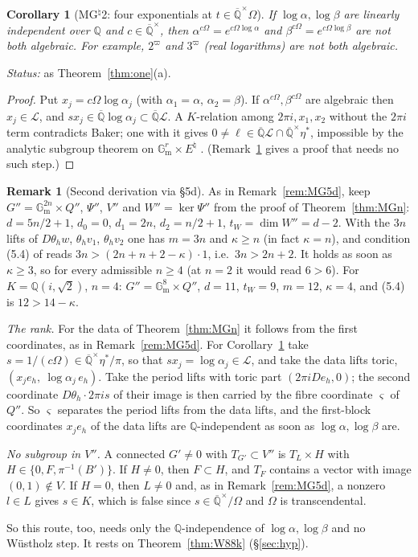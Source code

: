 \documentclass[11pt]{amsart}
\newtheorem{corollary}[theorem]{Corollary}
\theoremstyle{definition}
\newtheorem{remark}[theorem]{Remark}
\newcommand{\Qb}{\overline{\mathbb{Q}}}
\newcommand{\Q}{\mathbb{Q}}
\newcommand{\Gm}{\mathbb{G}_{\mathrm m}}
\newcommand{\Lg}{\mathcal{L}}
\newcommand{\vp}{\varpi}
\newcommand{\Status}{\noindent\emph{Status:} }
\begin{document}
\begin{corollary}[MG$^\natural$2: four exponentials at $t\in\Qb^\times\Omega$]\label{cor:MGn2}
If $\log\alpha,\log\beta$ are linearly independent over $\Q$ and $c\in\Qb^\times$, then $\alpha^{c\Omega}=e^{c\Omega\log\alpha}$
and $\beta^{c\Omega}=e^{c\Omega\log\beta}$ are not both algebraic. For example, $2^{\vp}$ and $3^{\vp}$ (real logarithms) are
not both algebraic.
\end{corollary}

\Status as Theorem~\ref{thm:one}(a).

\begin{proof}
Put $x_j=c\Omega\log\alpha_j$ (with $\alpha_1=\alpha$, $\alpha_2=\beta$). If $\alpha^{c\Omega},\beta^{c\Omega}$ are
algebraic then $x_j\in\Lg$, and $sx_j\in\Qb\log\alpha_j\subset\Qb\Lg$. A $K$-relation among $2\pi i,x_1,x_2$ without the
$2\pi i$ term contradicts Baker; one with it gives $0\ne\ell\in\Qb\Lg\cap\Qb^\times\eta^*$, impossible by the analytic
subgroup theorem on $\Gm^r\times E^\natural$ \cite{Wu89}. (Remark~\ref{rem:MGn5d} gives a proof that needs no such step.)
\end{proof}

\begin{remark}[Second derivation via \S5d]\label{rem:MGn5d}
As in Remark~\ref{rem:MG5d}, keep $G''=\Gm^{2n}\times Q''$, $\Psi''$, $V''$ and $W''=\ker\Psi''$ from the proof of
Theorem~\ref{thm:MGn}: $d=5n/2+1$, $d_0=0$, $d_1=2n$, $d_2=n/2+1$, $t_W=\dim W''=d-2$. With the $3n$ lifts of $D\theta_hw$,
$\theta_hv_1$, $\theta_hv_2$ one has $m=3n$ and $\kappa\ge n$ (in fact $\kappa=n$), and condition (5.4) of \cite{W88} reads
$3n>(2n+n+2-\kappa)\cdot1$, i.e.\ $3n>2n+2$. It holds as soon as $\kappa\ge3$, so for every admissible $n\ge4$ (at $n=2$ it
would read $6>6$). For $K=\Q(i,\sqrt2)$, $n=4$: $G''=\Gm^8\times Q''$, $d=11$, $t_W=9$, $m=12$, $\kappa=4$, and (5.4) is
$12>14-\kappa$.

\emph{The rank.} For the data of Theorem~\ref{thm:MGn} it follows from the first coordinates, as in
Remark~\ref{rem:MG5d}. For Corollary~\ref{cor:MGn2} take $s=1/(c\Omega)\in\Qb^\times\eta^*/\pi$, so that
$sx_j=\log\alpha_j\in\Lg$, and take the data lifts toric, $(x_je_h,\ \log\alpha_j\,e_h)$. Take the period lifts with toric
part $(2\pi iDe_h,0)$; the second coordinate $D\theta_h\cdot2\pi is$ of their image is then carried by the fibre
coordinate $\varsigma$ of $Q''$. So $\varsigma$ separates the period lifts from the data lifts, and the first-block coordinates
$x_je_h$ of the data lifts are $\Q$-independent as soon as $\log\alpha,\log\beta$ are.

\emph{No subgroup in $V''$.} A connected $G'\ne0$ with $T_{G'}\subset V''$ is $T_L\times H$ with $H\in\{0,F,\pi^{-1}(B')\}$. If
$H\ne0$, then $F\subset H$, and $T_F$ contains a vector with image $(0,1)\notin V$. If $H=0$, then $L\ne0$ and, as in
Remark~\ref{rem:MG5d}, a nonzero $l\in L$ gives $s\in K$, which is false since $s\in\Qb^\times/\Omega$ and $\Omega$ is
transcendental.

So this route, too, needs only the $\Q$-independence of $\log\alpha,\log\beta$ and no W\"ustholz step. It rests on
Theorem~\ref{thm:W88k} (\S\ref{sec:hyp}).
\end{remark}
\end{document}
